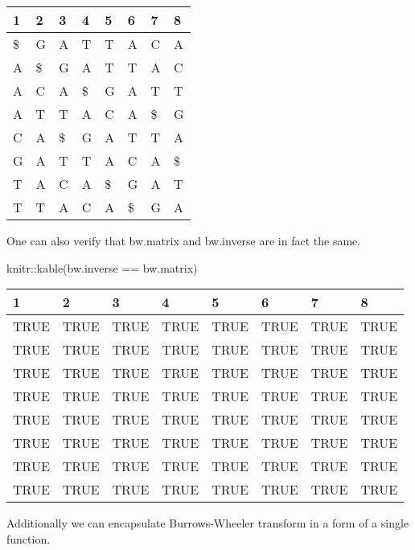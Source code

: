 \documentclass[
]{book}
\newenvironment{Shaded}{\begin{snugshade}}{\end{snugshade}}
\newcommand{\FunctionTok}[1]{\textcolor[rgb]{0.00,0.00,0.00}{#1}}
\newcommand{\NormalTok}[1]{#1}
\newcommand{\SpecialCharTok}[1]{\textcolor[rgb]{0.00,0.00,0.00}{#1}}
\begin{document}
\begin{tabular}{l|l|l|l|l|l|l|l}
\hline
1 & 2 & 3 & 4 & 5 & 6 & 7 & 8\\
\hline
\$ & G & A & T & T & A & C & A\\
\hline
A & \$ & G & A & T & T & A & C\\
\hline
A & C & A & \$ & G & A & T & T\\
\hline
A & T & T & A & C & A & \$ & G\\
\hline
C & A & \$ & G & A & T & T & A\\
\hline
G & A & T & T & A & C & A & \$\\
\hline
T & A & C & A & \$ & G & A & T\\
\hline
T & T & A & C & A & \$ & G & A\\
\hline
\end{tabular}

One can also verify that bw.matrix and bw.inverse are in fact the same.

\begin{Shaded}
\begin{Highlighting}[]
\NormalTok{knitr}\SpecialCharTok{::}\FunctionTok{kable}\NormalTok{(bw.inverse }\SpecialCharTok{==}\NormalTok{ bw.matrix)}
\end{Highlighting}
\end{Shaded}

\begin{tabular}{l|l|l|l|l|l|l|l}
\hline
1 & 2 & 3 & 4 & 5 & 6 & 7 & 8\\
\hline
TRUE & TRUE & TRUE & TRUE & TRUE & TRUE & TRUE & TRUE\\
\hline
TRUE & TRUE & TRUE & TRUE & TRUE & TRUE & TRUE & TRUE\\
\hline
TRUE & TRUE & TRUE & TRUE & TRUE & TRUE & TRUE & TRUE\\
\hline
TRUE & TRUE & TRUE & TRUE & TRUE & TRUE & TRUE & TRUE\\
\hline
TRUE & TRUE & TRUE & TRUE & TRUE & TRUE & TRUE & TRUE\\
\hline
TRUE & TRUE & TRUE & TRUE & TRUE & TRUE & TRUE & TRUE\\
\hline
TRUE & TRUE & TRUE & TRUE & TRUE & TRUE & TRUE & TRUE\\
\hline
TRUE & TRUE & TRUE & TRUE & TRUE & TRUE & TRUE & TRUE\\
\hline
\end{tabular}

Additionally we can encapsulate Burrows-Wheeler transform in a form of a single function.
\end{document}
